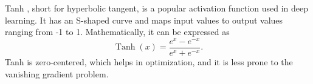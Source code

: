 


Tanh \cite{ackley1985learning}, short for hyperbolic tangent, is a popular activation function used in deep learning. It has an S-shaped curve and maps input values to output values ranging from -1 to 1. Mathematically, it can be expressed as
\begin{equation}
\label{eq:tanh}
\operatorname{Tanh}(x) = \frac{e^x - e^{-x}}{e^x + e^{-x}}.
\end{equation}
Tanh is zero-centered, which helps in optimization, and it is less prone to the vanishing gradient problem.

